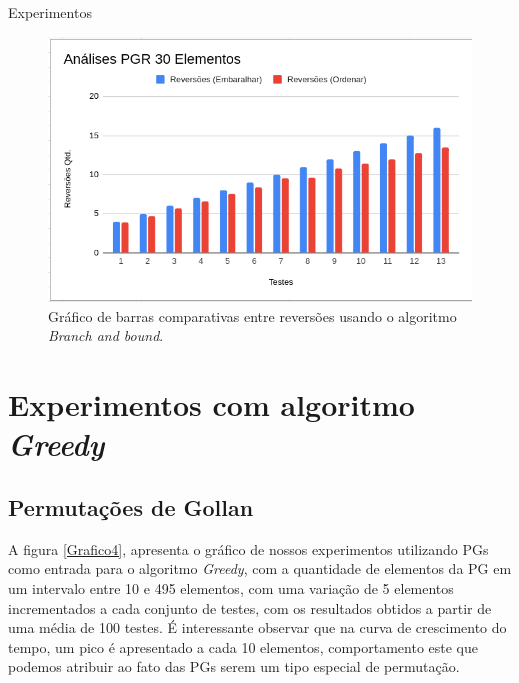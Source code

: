 \begin{chapter}{Experimentos}
\begin{figure}[H]
  \centering
  \begin{minipage}[b]{0.5\textwidth}
    \includegraphics[width=\textwidth]{Imagens/Analises/B_PGR3.png}
    \caption{\label{Grafico3}Gráfico  de barras comparativas entre reversões usando o algoritmo \textit{Branch and bound}.}
  \end{minipage}
\end{figure}

\section{Experimentos com algoritmo \textit{Greedy}}

\subsection{Permutações de Gollan}

A figura \ref{Grafico4}, apresenta o gráfico de nossos experimentos utilizando PGs como entrada para o algoritmo \textit{Greedy}, com a quantidade de elementos da PG em um intervalo entre 10 e 495 elementos, com uma variação de 5 elementos incrementados a cada conjunto de testes, com os resultados obtidos a partir de uma média de 100 testes. É interessante observar que na curva de crescimento do tempo, um pico é apresentado a cada 10 elementos, comportamento este que podemos atribuir ao fato das PGs serem um tipo especial de permutação. 


\end{chapter}
